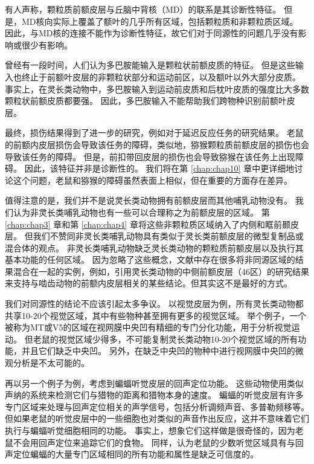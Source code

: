 有人声称，颗粒质前额皮层与丘脑中背核（MD）的联系是其诊断性特征\cite{je1948orbitofrontal,akert1964comparative,uylings2003rats}。
但是，MD核向实际上覆盖了额叶的几乎所有区域，包括颗粒质和非颗粒质区域。
因此，与MD核的连接不能作为诊断性特征，故它们对于同源性的问题几乎没有影响或很少有影响。


曾经有一段时间，人们认为多巴胺能输入是颗粒状前额皮质的特征\cite{divac1978converging,porrino1982brainstem}。
但是这些输入也终止于前额叶皮层的非颗粒状部分和运动前区，以及额叶以外大部分皮质。
事实上，在灵长类动物中，多巴胺输入到运动前皮质和后枕叶皮质的强度比大多数颗粒状前额皮质都要强\cite{gaspar1992topography,williams1998widespread}。
因此，多巴胺输入不能帮助我们跨物种识别前额叶皮层。


最终，损伤结果得到了进一步的研究，例如对于延迟反应任务的研究结果。
老鼠的前额内皮层损伤会导致该任务的障碍\cite{kolb1974double}，类似地，猕猴颗粒质前额皮层的损伤也会导致该任务的障碍\cite{goldman1971analysis}。
但是，前扣带回皮层的损伤也会导致猕猴在该任务上出现障碍\cite{meunier1997effects}。
因此，该特征并非是诊断性的。
我们将在第 \ref{chap:chap10} 章中更详细地讨论这个问题，老鼠和猕猴的障碍虽然表面上相似，但在重要的方面存在差异。


值得注意的是，我们并不是说灵长类动物拥有前额皮层而其他哺乳动物没有。
我们认为非灵长类哺乳动物也有一些可以合理称之为前额皮层的区域。
第 \ref{chap:chap3} 章和第 \ref{chap:chap4} 章将这些非颗粒质区域纳入了内侧和眶前颞皮层。
但我们不赞同非灵长类哺乳动物具有类似于灵长类前额皮层的微型复制品或混合体的观点。
非灵长类哺乳动物缺乏灵长类动物的颗粒质前额皮层以及执行其基本功能的任何区域。
因为忽略了这些概念，文献中存在很多将非同源区域的结果混合在一起的实例，例如，引用灵长类动物的中侧前额皮层（46区）的研究结果来支持与啮齿动物的前额内皮层相关的某些结论。但其实这不是最好的方式。


我们对同源性的结论不应该引起太多争议。
以视觉皮层为例，所有灵长类动物都共享10-20个视觉区域，其中有些物种甚至拥有更多的视觉区域\cite{kaas2020evolution}。
举个例子，一个被称为MT或V5的区域在视网膜中央凹有精细的专门分化功能，用于分析视觉运动。
但老鼠的视觉区域少得多\cite{rosa1999evolution,lyon200734}，不可能复制灵长类动物10-20个视觉区域的所有功能，并且它们缺乏中央凹。
另外，在缺乏中央凹的物种中进行视网膜中央凹的微观分析是不太可能的。


再以另一个例子为例，考虑到蝙蝠听觉皮层的回声定位功能。
这些动物使用类似声纳的系统来检测它们与猎物的距离和猎物本身的速度。
蝙蝠的听觉皮层有许多专门区域来处理与回声定位相关的声学信号，包括分析调频声音、多普勒频移等\cite{suga1997cortical,fitzpatrick1998distribution}。
但如果老鼠的听觉皮层中的一些细胞也对类似的声音作出反应，这并不意味着它们执行与蝙蝠听觉细胞相同的功能。
事实上，想象它们这样做是很奇怪的，因为老鼠不会用回声定位来追踪它们的食物。
同样，认为老鼠的少数听觉区域具有与回声定位蝙蝠的大量专门区域相同的所有功能和属性是缺乏可信度的。


